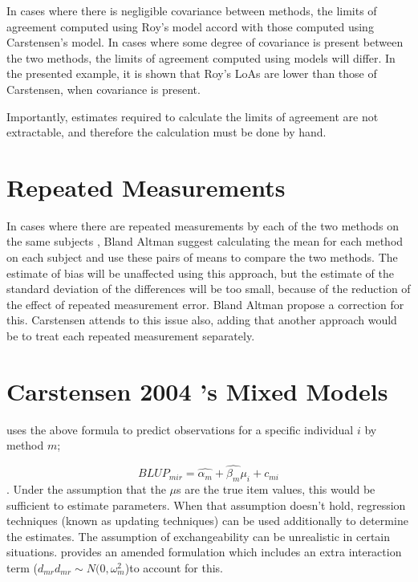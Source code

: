 \documentclass{report}
\begin{document}
	In cases where there is negligible covariance between methods, the limits of agreement computed using Roy's model accord with those computed using Carstensen's model. In cases where some degree of
	covariance is present between the two methods, the limits of agreement computed using models will differ. In the presented
	example, it is shown that Roy's LoAs are lower than those of Carstensen, when covariance is present.
	
	Importantly, estimates required to calculate the limits of agreement are not extractable, and therefore the calculation must
	be done by hand.
	\section{Repeated Measurements}
	
	In cases where there are repeated measurements by each of the two
	methods on the same subjects , Bland Altman suggest calculating
	the mean for each method on each subject and use these pairs of
	means to compare the two methods.
	The estimate of bias will be unaffected using this approach, but
	the estimate of the standard deviation of the differences will be
	too small, because of the reduction of the effect of repeated
	measurement error. Bland Altman propose a correction for this.
	Carstensen attends to this issue also, adding that another
	approach would be to treat each repeated measurement separately.
	
	\section{Carstensen 2004 's Mixed Models}
	
	
	
	\citet{BXC2004} uses the above formula to predict observations for
	a specific individual $i$ by method $m$;
	
	\begin{equation}BLUP_{mir} = \hat{\alpha_{m}} + \hat{\beta_{m}}\mu_{i} +
	c_{mi} \end{equation}. Under the assumption that the $\mu$s are
	the true item values, this would be sufficient to estimate
	parameters. When that assumption doesn't hold, regression techniques (known as updating techniques)
	can be used additionally to determine the estimates.
	The assumption of exchangeability can be unrealistic in certain situations.
	\citet{BXC2004} provides an amended formulation which includes an extra interaction
	term ($d_{mr} d_{mr} \sim N(0,\omega^{2}_{m}$)to account for this.
	
\end{document}
